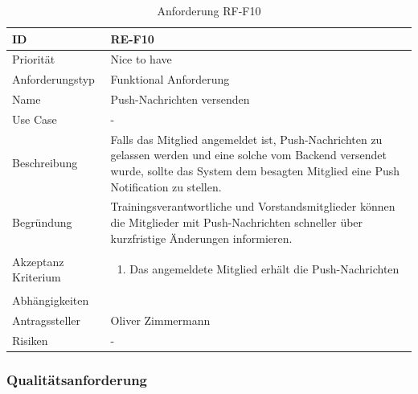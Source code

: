\begin{table}[ht]
\centering
  \begin{tabular}{ l | p{8cm} }
	\hline
	\rowcolor{gray}
	ID 			&	\textbf{RE-F10}\\ \hline
	Priorität 		&	Nice to have\\ \hline
	Anforderungstyp	&	Funktional Anforderung\\ \hline
	Name 			&	Push-Nachrichten versenden\\ \hline
	Use Case 		&	-\\ \hline
	Beschreibung 	&	Falls das Mitglied angemeldet ist, Push-Nachrichten zu gelassen werden und eine solche vom Backend versendet wurde, sollte das System dem besagten Mitglied eine Push Notification zu stellen.\\ \hline
	Begründung 		&	Trainingsverantwortliche und Vorstandsmitglieder können die Mitglieder mit Push-Nachrichten schneller über kurzfristige Änderungen informieren.\\ \hline
	Akzeptanz Kriterium	&	\begin{enumerate}
					\item Das angemeldete Mitglied erhält die Push-Nachrichten
					\end{enumerate}
					\\ \hline
	Abhängigkeiten 	&	\nameref{table:req_1}\\ \hline
	Antragssteller 	&	Oliver Zimmermann\\ \hline
	Risiken	 	&	-
  \end{tabular}
   \caption{Anforderung RF-F10}\label{table:req_10}
\end{table}

\newpage
\FloatBarrier
\subsubsection{Qualitätsanforderung}\label{non_func_anforderungen}


